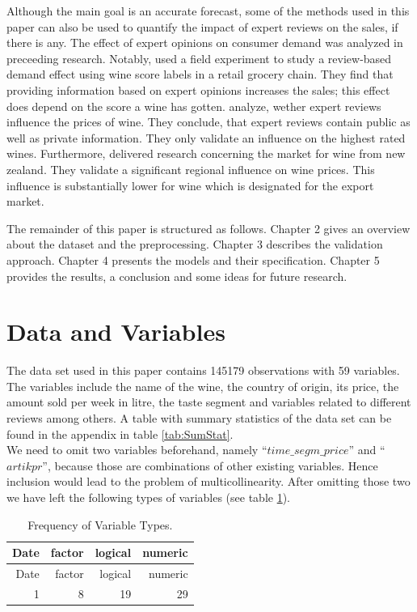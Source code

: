 \documentclass[11pt,]{article}
\begin{document}
Although the main goal is an accurate forecast, some of the methods used
in this paper can also be used to quantify the impact of expert reviews
on the sales, if there is any. The effect of expert opinions on consumer
demand was analyzed in preceeding research. Notably,
\textcite[][p. 1289]{Hilger2011} used a field experiment to study a
review-based demand effect using wine score labels in a retail grocery
chain. They find that providing information based on expert opinions
increases the sales; this effect does depend on the score a wine has
gotten. \textcite[][p. 293]{Ashenfelter2013} analyze, wether expert
reviews influence the prices of wine. They conclude, that expert reviews
contain public as well as private information. They only validate an
influence on the highest rated wines. Furthermore,
\textcite[][p. 182f.]{Bicknell2012} delivered research concerning the
market for wine from new zealand. They validate a significant regional
influence on wine prices. This influence is substantially lower for wine
which is designated for the export market.

The remainder of this paper is structured as follows. Chapter 2 gives an
overview about the dataset and the preprocessing. Chapter 3 describes
the validation approach. Chapter 4 presents the models and their
specification. Chapter 5 provides the results, a conclusion and some
ideas for future research.

\hypertarget{data-and-variables}{%
\section{Data and Variables}\label{data-and-variables}}

The data set used in this paper contains 145179 observations with 59
variables. The variables include the name of the wine, the country of
origin, its price, the amount sold per week in litre, the taste segment
and variables related to different reviews among others. A table with
summary statistics of the data set can be found in the appendix in table
\ref{tab:SumStat}.\\
We need to omit two variables beforehand, namely
\enquote{\(time\_segm\_price\)} and \enquote{\(artikpr\)}, because those
are combinations of other existing variables. Hence inclusion would lead
to the problem of multicollinearity. After omitting those two we have
left the following types of variables (see table \ref{tab:VarTyp}).

\begin{longtable}[]{@{}rrrr@{}}
\caption{\label{tab:VarTyp}Frequency of Variable Types.}\tabularnewline
\toprule
Date & factor & logical & numeric\tabularnewline
\midrule
\endfirsthead
\toprule
Date & factor & logical & numeric\tabularnewline
\midrule
\endhead
1 & 8 & 19 & 29\tabularnewline
\bottomrule
\end{longtable}
\end{document}
